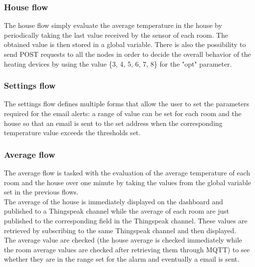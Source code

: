 \subsubsection*{House flow}
The house flow simply evaluate the average temperature in the house by periodically taking the last value received by the sensor of each room. The obtained value is then stored in a global variable. There is also the possibility to send POST requests to all the nodes in order to decide the overall behavior of the heating devices by using the value \{3, 4, 5, 6, 7, 8\} for the "opt" parameter.

\subsubsection*{Settings flow}
The settings flow defines multiple forms that allow the user to set the parameters required for the email alerts: a range of value can be set for each room and the house so that an email is sent to the set address when the corresponding temperature value exceeds the thresholds set.

\subsubsection*{Average flow}
The average flow is tasked with the evaluation of the average temperature of each room and the house over one minute by taking the values from the global variable set in the previous flows.\\
The average of the house is immediately displayed on the dashboard and published to a Thingspeak channel while the average of each room are just published to the corresponding field in the Thingspeak channel. These values are retrieved by subscribing to the same Thingspeak channel and then displayed.\\
The average value are checked (the house average is checked immediately while the room average values are checked after retrieving them through MQTT) to see whether they are in the range set for the alarm and eventually a email is sent.

